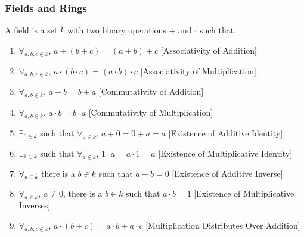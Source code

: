 \documentclass[crop=false,class=book,oneside]{standalone}
\begin{document}
            \subsubsection{Fields and Rings}
                \begin{definition}
                    A field is a set $k$ with two binary
                    operations $+$ and $\cdot$ such that:
                    \begin{enumerate}
                        \item $\forall_{a,b,c\in k}$,
                              $a+(b+c)=(a+b)+c$
                              \hfill[Associativity of Addition]
                        \item $\forall_{a,b,c\in k}$,
                              $a\cdot(b\cdot c)=(a\cdot b)\cdot c$
                              \hfill[Associativity of Multiplication]
                        \item $\forall_{a,b\in k}$,
                              $a+b=b+a$
                              \hfill[Commutativity of Addition]
                        \item $\forall_{a,b\in k}$,
                              $a\cdot b=b\cdot a$
                              \hfill[Commutativity of Multiplication]
                        \item $\exists_{0 \in k}$ such that
                              $\forall_{a\in k}$,
                              $a+0=0+a=a$
                              \hfill[Existence of Additive Identity]
                        \item $\exists_{1\in k}$ such that
                              $\forall_{a\in k}$,
                              $1\cdot a=a\cdot 1=a$
                              \hfill[Existence of Multiplicative Identity]
                        \item $\forall_{a\in k}$ there is a
                              $b\in k$ such that $a+b=0$
                              \hfill[Existence of Additive Inverse]
                        \item $\forall_{a\in k}$, $a\ne 0$,
                              there is a $b\in k$ such that
                              $a\cdot b=1$
                              \hfill [Existence of Multiplicative Inverses]
                        \item $\forall_{a,b,c\in k}$,
                              $a\cdot(b+c)=a\cdot b+a\cdot c$
                              \hfill[Multiplication Distributes Over Addition]
                    \end{enumerate}
                \end{definition}
\end{document}
